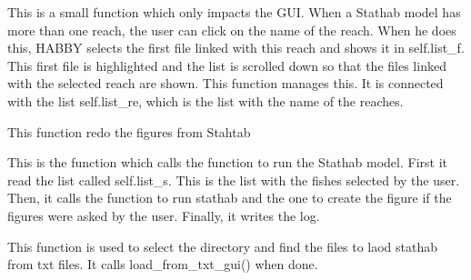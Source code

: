 \documentclass[letterpaper,10pt,english]{sphinxmanual}
\begin{document}
\begin{fulllineitems}
\begin{fulllineitems}

This is a small function which only impacts the GUI. When a Stathab model has more than one reach,
the user can click on the name of the reach. When he does this, HABBY selects the first file linked
with this reach and shows it in self.list\_f. This first file is highlighted and the list is scrolled
down so that the files linked with the selected reach are shown. This function manages this. It is connected
with the list self.list\_re, which is the list with the name of the reaches.

\end{fulllineitems}


\begin{fulllineitems}
\label{\detokenize{index:src_GUI.stathab_GUI.StathabW.recreate_image}}
This function redo the figures from Stahtab

\end{fulllineitems}


\begin{fulllineitems}
\label{\detokenize{index:src_GUI.stathab_GUI.StathabW.run_stathab_gui}}
This is the function which calls the function to run the Stathab model.  First it read the list called
self.list\_s. This is the list with the fishes selected by the user. Then, it calls the function to run
stathab and the one to create the figure if the figures were asked by the user. Finally, it writes the log.

\end{fulllineitems}


\begin{fulllineitems}
\label{\detokenize{index:src_GUI.stathab_GUI.StathabW.select_dir}}
This function is used to select the directory and find the files to laod stathab from txt files. It calls
load\_from\_txt\_gui() when done.

\end{fulllineitems}



\end{fulllineitems}
\end{document}
